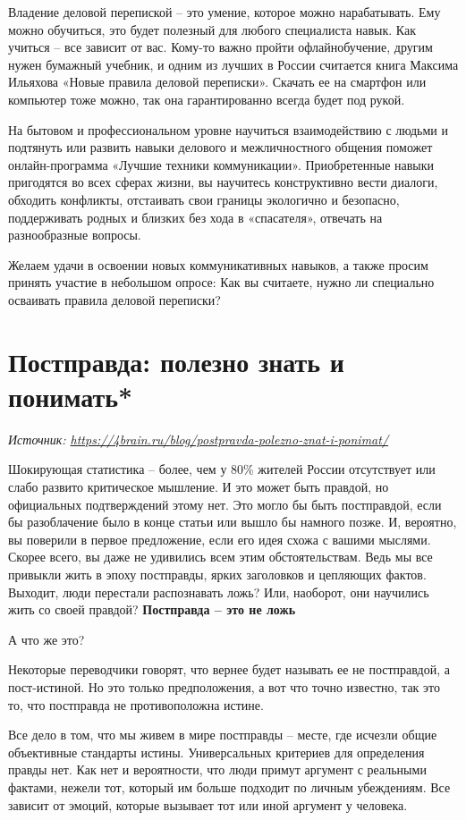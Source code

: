 Владение деловой перепиской – это умение, которое можно нарабатывать. Ему можно обучиться, это будет полезный для любого специалиста навык. Как учиться – все зависит от вас. Кому-то важно пройти офлайнобучение, другим нужен бумажный учебник, и одним из лучших в России считается книга Максима Ильяхова «Новые правила деловой переписки».  Скачать ее на смартфон или компьютер тоже можно, так она гарантированно всегда будет под рукой.

На бытовом и профессиональном уровне научиться взаимодействию с людьми и подтянуть или развить навыки делового и межличностного общения поможет онлайн-программа «Лучшие техники коммуникации». Приобретенные навыки пригодятся во всех сферах жизни, вы научитесь конструктивно вести диалоги, обходить конфликты, отстаивать свои границы экологично и безопасно, поддерживать родных и близких без хода в «спасателя», отвечать на разнообразные вопросы.

Желаем удачи в освоении новых коммуникативных навыков, а также просим принять участие в небольшом опросе: Как вы считаете, нужно ли специально осваивать правила деловой переписки?

\clearpage

\section{Постправда: полезно знать и понимать*}

\textit{Источник: \url{https://4brain.ru/blog/postpravda-polezno-znat-i-ponimat/}}

Шокирующая статистика – более, чем у 80\% жителей России отсутствует или слабо развито критическое мышление. И это может быть правдой, но официальных подтверждений этому нет. Это могло бы быть постправдой, если бы разоблачение было в конце статьи или вышло бы намного позже. И, вероятно, вы поверили в первое предложение, если его идея схожа с вашими мыслями. Скорее всего, вы даже не удивились всем этим обстоятельствам. Ведь мы все привыкли жить в эпоху постправды, ярких заголовков и цепляющих фактов. Выходит, люди перестали распознавать ложь? Или, наоборот, они научились жить со своей правдой?
\textbf{Постправда – это не ложь}

А что же это?

Некоторые переводчики говорят, что вернее будет называть ее не постправдой, а пост-истиной. Но это только предположения, а вот что точно известно, так это то, что постправда не противоположна истине.

Все дело в том, что мы живем в мире постправды – месте, где исчезли общие объективные стандарты истины. Универсальных критериев для определения правды нет. Как нет и вероятности, что люди примут аргумент с реальными фактами, нежели тот, который им больше подходит по личным убеждениям. Все зависит от эмоций, которые вызывает тот или иной аргумент у человека.


